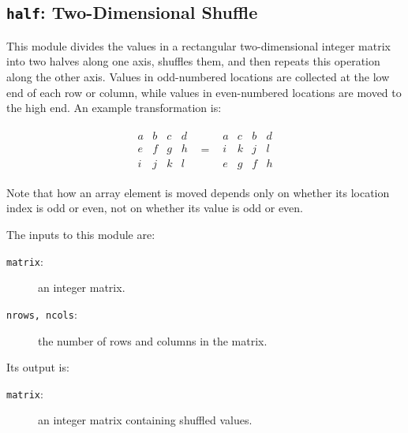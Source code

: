 \subsection{{\tt{half}}:
	Two-Dimensional Shuffle
	\label{s:toys-half}}

This module divides the values in a rectangular two-dimensional integer matrix into two halves along one axis,
shuffles them,
and then repeats this operation along the other axis.
Values in odd-numbered locations are collected at the low end of each row or column,
while values in even-numbered locations are moved to the high end.
An example transformation is:

\begin{eqnarray*}
\begin{array}{cccc}
a & b & c & d \\
e & f & g & h \\
i & j & k & l
\end{array}
& = &
\begin{array}{cccc}
a & c & b & d \\
i & k & j & l \\
e & g & f & h
\end{array}
\end{eqnarray*}

Note that how an array element is moved depends only on whether its location index is odd or even,
not on whether its value is odd or even.

The inputs to this module are:
\begin{description}
\item[{\tt{matrix}}:]
	an integer matrix.
\item[{\tt{nrows, ncols}}:]
	the number of rows and columns in the matrix.
\end{description}
Its output is:
\begin{description}
\item[{\tt{matrix}}:]
	an integer matrix containing shuffled values.
\end{description}
